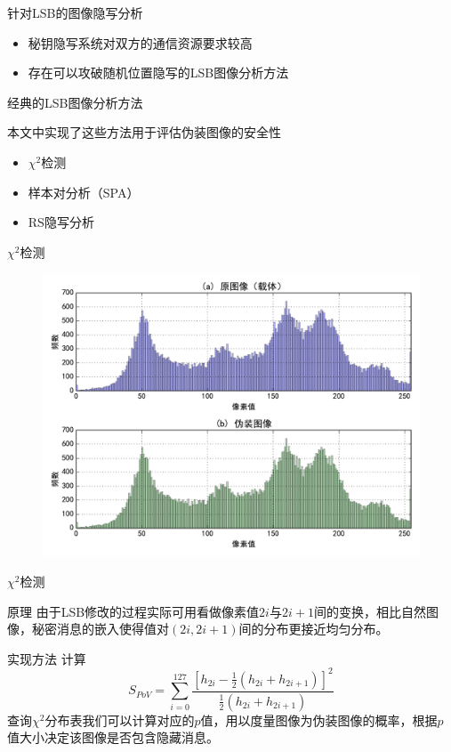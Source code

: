 \documentclass[14pt]{Bredelebeamer}
\begin{document}
\begin{frame}{针对LSB的图像隐写分析}
  \begin{itemize}
    \item 秘钥隐写系统对双方的通信资源要求较高
    \item 存在可以攻破随机位置隐写的LSB图像分析方法
      \end{itemize}
    \begin{block}{经典的LSB图像分析方法}

      本文中实现了这些方法用于评估伪装图像的安全性
  \begin{itemize}
    \item $\chi^2$检测
    \item 样本对分析（SPA）
    \item RS隐写分析
  \end{itemize}
    \end{block}
\end{frame}

\begin{frame}{$\chi^2$检测}
  \subtitle{值对分析：伪装图像的直方图中存在更多大致等高的像素值对}
  \begin{figure}
    \centering
    \includegraphics[width=.9\textwidth]{images/hist2}
  \end{figure}
\end{frame}

\begin{frame}{$\chi^2$检测}
  \begin{exampleblock}{原理}
  由于LSB修改的过程实际可用看做像素值$2i$与$2i+1$间的变换，相比自然图像，秘密消息的嵌入使得值对$\left( 2i , 2i+1\right)$间的分布更接近均匀分布。
\end{exampleblock}

\begin{block}{实现方法}
  计算
  $${S_{PoV}} = \sum\limits_{i = 0}^{127} {\frac{{{{\left[ {{h_{2i}} - \frac{1}{2}\left( {{h_{2i}} + {h_{2i + 1}}} \right)} \right]}^2}}}{{\frac{1}{2}\left( {{h_{2i}} + {h_{2i + 1}}} \right)}}}$$
  查询$\chi^2$分布表我们可以计算对应的$p$值，用以度量图像为伪装图像的概率，根据$p$值大小决定该图像是否包含隐藏消息。
\end{block}
\end{frame}
\end{document}
